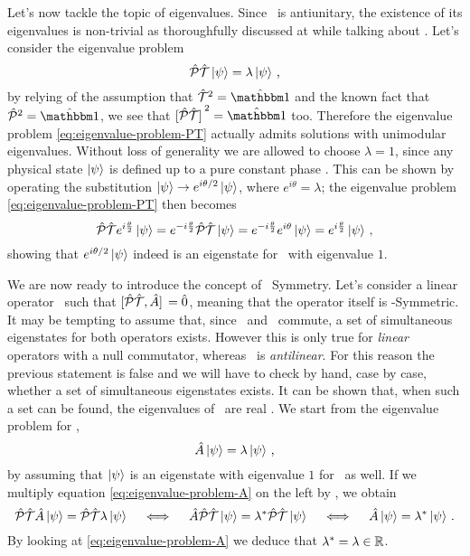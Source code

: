         Let's now tackle the topic of eigenvalues. Since \hPT\ is antiunitary, the existence of its eigenvalues is non-trivial as thoroughfully discussed at  while talking about \hT. Let's consider the eigenvalue problem
        \begin{equation}
            \label{eq:eigenvalue-problem-PT}
            \mathcal{\hat{P}}\mathcal{\hat{T}} \ket{\psi} = \lambda \ket{\psi}
            \,\text{,}
        \end{equation}
        by relying of the assumption that $\hT^2 = \togglehat{\idM}$ and the known fact that $\hP^2 = \togglehat{\idM}$, we see that $\bqty*{\hPT}^2 = \togglehat{\idM}$ too. Therefore the eigenvalue problem \eqref{eq:eigenvalue-problem-PT} actually admits solutions with unimodular eigenvalues. Without loss of generality we are allowed to choose $\lambda = 1$, since any physical state $\ket{\psi}$ is defined up to a pure constant phase \cite{Bender2005}. This can be shown by operating the substitution $\ket{\psi} \rightarrow e^{i\theta / 2}\ket{\psi}$, where $e^{i\theta} = \lambda$; the eigenvalue problem \eqref{eq:eigenvalue-problem-PT} then becomes
        \begin{equation*}
            \mathcal{\hat{P}}\mathcal{\hat{T}} e^{i\frac{\theta}{2}} \ket{\psi} = e^{-i\frac{\theta}{2}} \mathcal{\hat{P}}\mathcal{\hat{T}} \ket{\psi} = e^{-i\frac{\theta}{2}} e^{i\theta} \ket{\psi} = e^{i\frac{\theta}{2}} \ket{\psi}
            \,\text{,}
        \end{equation*}
        showing that $e^{i\theta / 2}\ket{\psi}$ indeed is an eigenstate for \hPT\ with eigenvalue $1$.

        We are now ready to introduce the concept of \PT\ Symmetry. Let's consider a linear operator \hA\ such that $\comm*{\hPT}{\hA} = \hzero$, meaning that the operator itself is \PT-Symmetric. It may be tempting to assume that, since \hA\ and \hPT\ commute, a set of simultaneous eigenstates for both operators exists. However this is only true for \emph{linear} operators with a null commutator, whereas \hPT\ is \emph{antilinear}. For this reason the previous statement is false \cite{bender2024} and we will have to check by hand, case by case, whether a set of simultaneous eigenstates exists. It can be shown that, when such a set can be found, the eigenvalues of \hA\ are real \cite{bender2024}. We start from the eigenvalue problem for \hA,
        \begin{equation}
            \label{eq:eigenvalue-problem-A}
            \hat{A} \ket{\psi} = \lambda \ket{\psi}
            \,\text{,}
        \end{equation}
        by assuming that $\ket{\psi}$ is an eigenstate with eigenvalue $1$ for \hPT\ as well. If we multiply equation \eqref{eq:eigenvalue-problem-A} on the left by \hPT, we obtain
        \begin{equation*}
            \mathcal{\hat{P}}\mathcal{\hat{T}} \hat{A} \ket{\psi} = \mathcal{\hat{P}}\mathcal{\hat{T}} \lambda \ket{\psi}
            \quad\iff\quad
            \hat{A} \mathcal{\hat{P}}\mathcal{\hat{T}} \ket{\psi} = \lambda^* \mathcal{\hat{P}}\mathcal{\hat{T}} \ket{\psi}
            \quad\iff\quad
            \hat{A} \ket{\psi} = \lambda^* \ket{\psi}
            \,\text{.}
        \end{equation*}
        By looking at \eqref{eq:eigenvalue-problem-A} we deduce that $\lambda^* = \lambda \in \mathbb{R}$.

